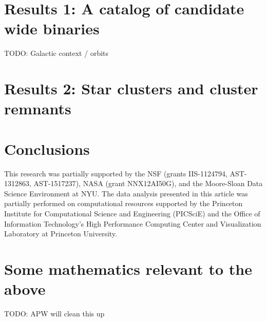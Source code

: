 \documentclass[manuscript, letterpaper]{aastex6}
\newcommand{\project}[1]{\textsl{#1}}
\newcommand{\acronym}[1]{{\small{#1}}}
\newcommand{\apogee}{\project{\acronym{APOGEE}}}
\newcommand{\todo}[1]{{\color{red}TODO: #1}}
\begin{document}
\section{Results 1: A catalog of candidate wide binaries}

\todo{Galactic context / orbits}

\section{Results 2: Star clusters and cluster remnants}

\section{Conclusions}

\acknowledgements

This research was partially supported by the \acronym{NSF} (grants
  \acronym{IIS-1124794}, \acronym{AST-1312863}, \acronym{AST-1517237}),
  \acronym{NASA} (grant \acronym{NNX12AI50G}),
  and the Moore-Sloan Data Science Environment at \acronym{NYU}. The data
analysis presented in this article was partially performed on computational
resources supported by the Princeton Institute for Computational Science and
Engineering (PICSciE) and the Office of Information Technology's High
Performance Computing Center and Visualization Laboratory at Princeton
University.






\appendix

\section{Some mathematics relevant to the above} \label{sec:appendix}

\todo{APW will clean this up}
\end{document}
